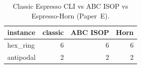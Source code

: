 \begin{table}[h]\centering\small
\caption{Classic Espresso CLI vs ABC ISOP vs Espresso-Horn (Paper~E).}
\label{tab:classic-espresso}
\begin{tabular}{lrrr}\hline
instance & classic & ABC ISOP & Horn \\\hline
hex\_ring & 6 & 6 & 6 \\
antipodal & 2 & 2 & 2 \\
\hline\end{tabular}\end{table}
